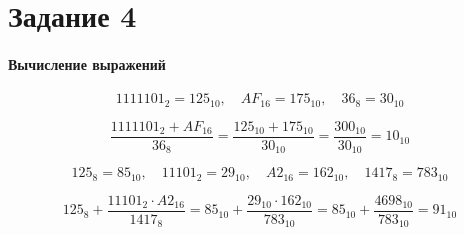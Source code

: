\documentclass[a4paper,12pt]{article}
\begin{document}
\section*{Задание 4}

\paragraph{Вычисление выражений}

$$
1111101_2 = 125_{10}, \quad AF_{16} = 175_{10}, \quad 36_8 = 30_{10}
$$

$$
\frac{1111101_2 + AF_{16}}{36_8}
= \frac{125_{10} + 175_{10}}{30_{10}}
= \frac{300_{10}}{30_{10}}
= 10_{10}
$$

$$
125_8 = 85_{10}, \quad 11101_2 = 29_{10}, \quad A2_{16} = 162_{10},
\quad 1417_8 = 783_{10}
$$

$$
125_8 + \frac{11101_2 \cdot A2_{16}}{1417_8}
= 85_{10} + \frac{29_{10} \cdot 162_{10}}{783_{10}}
= 85_{10} + \frac{4698_{10}}{783_{10}}
= 91_{10}
$$
\end{document}
